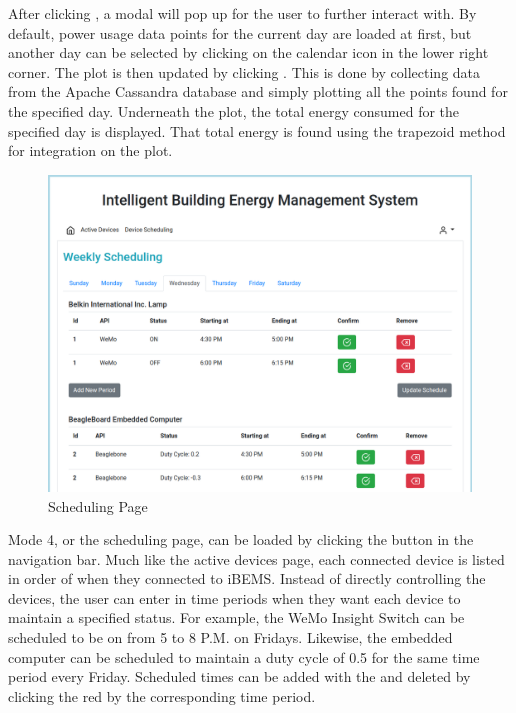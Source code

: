 \documentclass[conference]{IEEEtran}
\begin{document}
After clicking , a modal will pop up for the user to further interact with. By default, power usage data points for the current day are loaded at first, but another day can be selected by clicking on the calendar icon in the lower right corner. The plot is then updated by clicking . This is done by collecting data from the Apache Cassandra database and simply plotting all the points found for the specified day. Underneath the plot, the total energy consumed for the specified day is displayed. That total energy is found using the trapezoid method for integration on the plot.

\begin{figure}[htbp]
    \centering
    \includegraphics[scale=0.2]{figs/webServer/Applications_screen.png}
    \caption{Scheduling Page}
    \label{fig:schedulingl}
\end{figure}

Mode 4, or the scheduling page, can be loaded by clicking the  button in the navigation bar. Much like the active devices page, each connected device is listed in order of when they connected to iBEMS. Instead of directly controlling the devices, the user can enter in time periods when they want each device to maintain a specified status. For example, the WeMo Insight Switch can be scheduled to be on from 5 to 8 P.M. on Fridays. Likewise, the embedded computer can be scheduled to maintain a duty cycle of 0.5 for the same time period every Friday. Scheduled times can be added with the  and deleted by clicking the red  by the corresponding time period.
\end{document}

